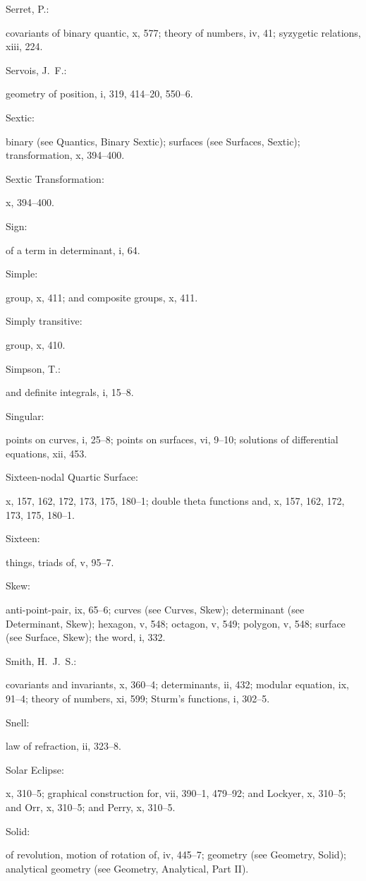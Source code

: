 \documentclass[11pt,a4paper]{book}
\providecommand{\V}[1]{#1}
\providecommand{\IndexEntry}[2]{#1\dotfill #2\par}
\begin{document}
\IndexEntry{Serret, P.}: covariants of binary quantic, \V{x}, 577; theory of numbers, \V{iv}, 41; syzygetic relations, \V{xiii}, 224.

\IndexEntry{Servois, J.\ F.}: geometry of position, \V{i}, 319, 414--20, 550--6.

\IndexEntry{Sextic}: binary (see Quantics, Binary Sextic); surfaces (see Surfaces, Sextic); transformation, \V{x}, 394--400.

\newpage

\setcounter{page}{123}

\IndexEntry{Sextic Transformation}: \V{x}, 394--400.

\IndexEntry{Sign}: of a term in determinant, \V{i}, 64.

\IndexEntry{Simple}: group, \V{x}, 411; and composite groups, \V{x}, 411.

\IndexEntry{Simply transitive}: group, \V{x}, 410.

\IndexEntry{Simpson, T.}: and definite integrals, \V{i}, 15--8.

\IndexEntry{Singular}: points on curves, \V{i}, 25--8; points on surfaces, \V{vi}, 9--10; solutions of differential equations, \V{xii}, 453.

\IndexEntry{Sixteen-nodal Quartic Surface}: \V{x}, 157, 162, 172, 173, 175, 180--1; double theta functions and, \V{x}, 157, 162, 172, 173, 175, 180--1.

\IndexEntry{Sixteen}: things, triads of, \V{v}, 95--7.

\IndexEntry{Skew}: anti-point-pair, \V{ix}, 65--6; curves (see Curves, Skew); determinant (see Determinant, Skew); hexagon, \V{v}, 548; octagon, \V{v}, 549; polygon, \V{v}, 548; surface (see Surface, Skew); the word, \V{i}, 332.

\IndexEntry{Smith, H.\ J.\ S.}: covariants and invariants, \V{x}, 360--4; determinants, \V{ii}, 432; modular equation, \V{ix}, 91--4; theory of numbers, \V{xi}, 599; Sturm's functions, \V{i}, 302--5.

\IndexEntry{Snell}: law of refraction, \V{ii}, 323--8.

\IndexEntry{Solar Eclipse}: \V{x}, 310--5; graphical construction for, \V{vii}, 390--1, 479--92; and Lockyer, \V{x}, 310--5; and Orr, \V{x}, 310--5; and Perry, \V{x}, 310--5.

\IndexEntry{Solid}: of revolution, motion of rotation of, \V{iv}, 445--7; geometry (see Geometry, Solid); analytical geometry (see Geometry, Analytical, Part II).
\end{document}
